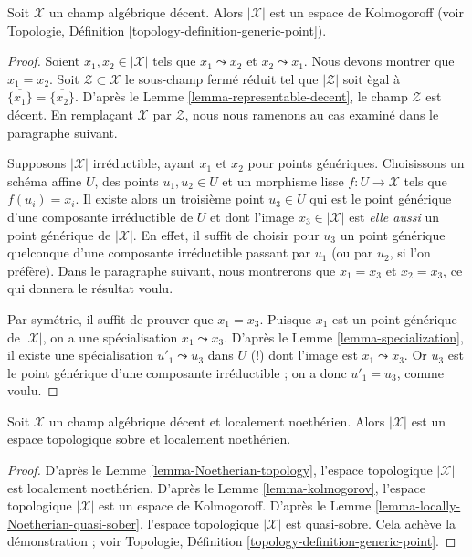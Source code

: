 \begin{lemma}
\label{lemma-kolmogorov}
Soit $\mathcal{X}$ un champ alg\'ebrique d\'ecent.
Alors $|\mathcal{X}|$ est un espace de Kolmogoroff (voir
Topologie, D\'efinition \ref{topology-definition-generic-point}).
\end{lemma}

\begin{proof}
Soient $x_1, x_2 \in |\mathcal{X}|$ tels que $x_1 \leadsto x_2$ et
$x_2 \leadsto x_1$. Nous devons montrer que $x_1 = x_2$.
Soit $\mathcal{Z} \subset \mathcal{X}$ le sous-champ ferm\'e
r\'eduit tel que $|\mathcal{Z}|$ soit \`egal \`a
$\overline{\{x_1\}} = \overline{\{x_2\}}$.
D'apr\`es le Lemme \ref{lemma-representable-decent},
le champ $\mathcal{Z}$ est d\'ecent.
En rempla\c{c}ant $\mathcal{X}$ par $\mathcal{Z}$, nous nous ramenons
au cas examin\'e dans le paragraphe suivant.

\medskip\noindent
Supposons $|\mathcal{X}|$ irr\'eductible, ayant $x_1$ et $x_2$
pour points g\'en\'eriques. Choisissons un sch\'ema affine $U$, des points $u_1, u_2 \in U$
et un morphisme lisse $f : U \to \mathcal{X}$ tels que
$f(u_i) = x_i$. Il existe alors un troisi\`eme point $u_3 \in U$
qui est le point g\'en\'erique d'une composante irr\'eductible de $U$
et dont l'image $x_3 \in |\mathcal{X}|$ est {\it elle aussi} un
point g\'en\'erique de $|\mathcal{X}|$. En effet, il suffit de
choisir pour $u_3$ un point g\'en\'erique quelconque d'une composante irr\'eductible
passant par $u_1$ (ou par $u_2$, si l'on pr\'ef\`ere).
Dans le paragraphe suivant, nous montrerons que $x_1 = x_3$ et $x_2 = x_3$,
ce qui donnera le r\'esultat voulu.

\medskip\noindent
Par sym\'etrie, il suffit de prouver que $x_1 = x_3$. Puisque $x_1$
est un point g\'en\'erique de $|\mathcal{X}|$, on a une sp\'ecialisation
$x_1 \leadsto x_3$.
D'apr\`es le Lemme \ref{lemma-specialization}, il existe une sp\'ecialisation
$u'_1 \leadsto u_3$ dans $U$ (!) dont l'image est $x_1 \leadsto x_3$.
Or $u_3$ est le point g\'en\'erique d'une composante irr\'eductible ;
on a donc $u'_1 = u_3$, comme voulu.
\end{proof}

\begin{lemma}
\label{lemma-decent-locally-noetherian-sober}
Soit $\mathcal{X}$ un champ alg\'ebrique d\'ecent et localement noeth\'erien.
Alors $|\mathcal{X}|$ est un espace topologique sobre et localement noeth\'erien.
\end{lemma}

\begin{proof}
D'apr\`es le Lemme \ref{lemma-Noetherian-topology}, l'espace topologique $|\mathcal{X}|$
est localement noeth\'erien. D'apr\`es le Lemme \ref{lemma-kolmogorov}, l'espace topologique
$|\mathcal{X}|$ est un espace de Kolmogoroff. D'apr\`es le
Lemme \ref{lemma-locally-Noetherian-quasi-sober}, l'espace topologique
$|\mathcal{X}|$ est quasi-sobre. Cela ach\`eve la d\'emonstration ; voir
Topologie, D\'efinition \ref{topology-definition-generic-point}.
\end{proof}

